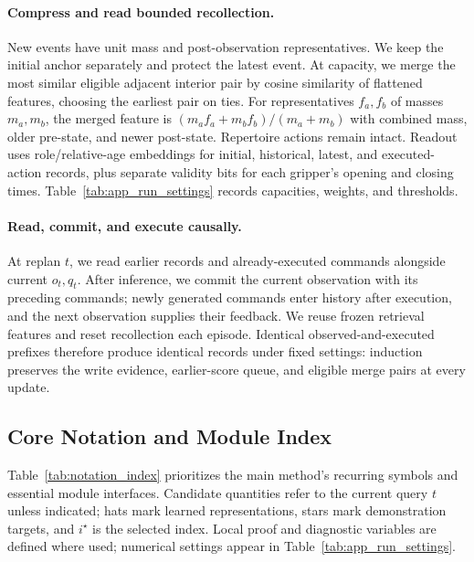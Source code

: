 \paragraph{Compress and read bounded recollection.}
New events have unit mass and post-observation representatives.
We keep the initial anchor separately and protect the latest event.
At capacity, we merge the most similar eligible adjacent interior pair by cosine similarity of flattened features, choosing the earliest pair on ties.
For representatives $f_a,f_b$ of masses $m_a,m_b$, the merged feature is $(m_af_a+m_bf_b)/(m_a+m_b)$ with combined mass, older pre-state, and newer post-state.
Repertoire actions remain intact.
Readout uses role/relative-age embeddings for initial, historical, latest, and executed-action records, plus separate validity bits for each gripper's opening and closing times.
Table~\ref{tab:app_run_settings} records capacities, weights, and thresholds.

\paragraph{Read, commit, and execute causally.}
At replan $t$, we read earlier records and already-executed commands alongside current $o_t,q_t$.
After inference, we commit the current observation with its preceding commands; newly generated commands enter history after execution, and the next observation supplies their feedback.
We reuse frozen retrieval features and reset recollection each episode.
Identical observed-and-executed prefixes therefore produce identical records under fixed settings: induction preserves the write evidence, earlier-score queue, and eligible merge pairs at every update.

\subsection{Core Notation and Module Index}
\label{app:symbols}

Table~\ref{tab:notation_index} prioritizes the main method's recurring symbols and essential module interfaces.
Candidate quantities refer to the current query $t$ unless indicated; hats mark learned representations, stars mark demonstration targets, and $i^\star$ is the selected index.
Local proof and diagnostic variables are defined where used; numerical settings appear in Table~\ref{tab:app_run_settings}.

